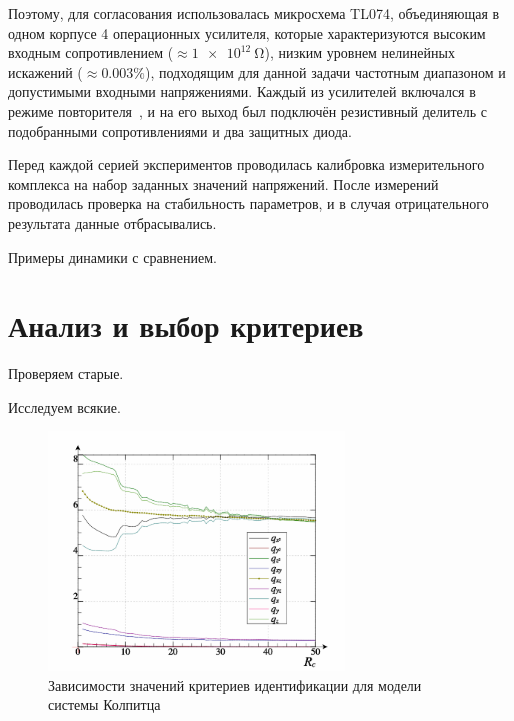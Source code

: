 Поэтому, для согласования использовалась микросхема TL074,
объединяющая в одном корпусе 4 операционных усилителя,
которые характеризуются высоким входным сопротивлением ($\approx \SI{1e12}{\ohm}$),
низким уровнем нелинейных искажений ($\approx 0.003\%$),
подходящим для данной задачи частотным диапазоном
и допустимыми входными напряжениями.
Каждый из усилителей включался в режиме повторителя~\cite{horowitz},
и на его выход был подключён резистивный делитель
с подобранными сопротивлениями и два защитных диода.

Перед каждой серией экспериментов проводилась калибровка
измерительного комплекса на набор заданных значений напряжений.
После измерений проводилась проверка на стабильность
параметров, и в случая отрицательного результата
данные отбрасывались.


Примеры динамики с сравнением.


\section{Анализ и выбор критериев}  %

Проверяем старые.

Исследуем всякие.

\begin{figure}[htb!]
\centerline{\includegraphics[width=0.7\textwidth]{p/colp_bjt_q-p_Rc_q.png} }
\caption{Зависимости значений критериев идентификации для модели системы Колпитца}
\label{atu:f:colp_bjt_q-p_Rc_q}
\end{figure}


